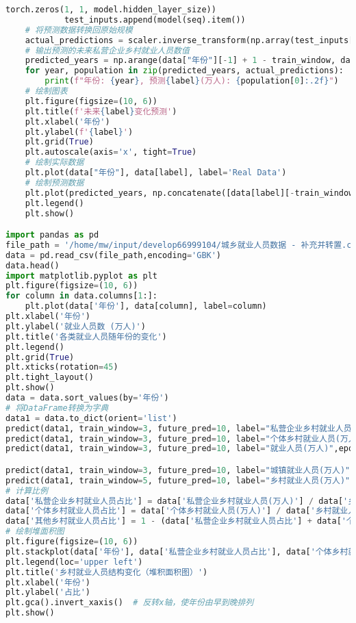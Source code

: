 \begin{lstlisting}[language=python,caption={就业前景}]
                                torch.zeros(1, 1, model.hidden_layer_size))
            test_inputs.append(model(seq).item())
    # 将预测数据转换回原始规模
    actual_predictions = scaler.inverse_transform(np.array(test_inputs[train_window:]).reshape(-1, 1))
    # 输出预测的未来私营企业乡村就业人员数值
    predicted_years = np.arange(data["年份"][-1] + 1 - train_window, data["年份"][-1] + 1 + future_pred)
    for year, population in zip(predicted_years, actual_predictions):
        print(f"年份: {year}, 预测{label}(万人): {population[0]:.2f}")
    # 绘制图表
    plt.figure(figsize=(10, 6))
    plt.title(f'未来{label}变化预测')
    plt.xlabel('年份')
    plt.ylabel(f'{label}')
    plt.grid(True)
    plt.autoscale(axis='x', tight=True)
    # 绘制实际数据
    plt.plot(data["年份"], data[label], label='Real Data')
    # 绘制预测数据
    plt.plot(predicted_years, np.concatenate([data[label][-train_window:], actual_predictions.ravel()]), label='Predictions', linestyle='--')
    plt.legend()
    plt.show()

import pandas as pd
file_path = '/home/mw/input/develop66999104/城乡就业人员数据 - 补充并转置.csv'
data = pd.read_csv(file_path,encoding='GBK')
data.head()
import matplotlib.pyplot as plt
plt.figure(figsize=(10, 6))
for column in data.columns[1:]:
    plt.plot(data['年份'], data[column], label=column)
plt.xlabel('年份')
plt.ylabel('就业人员数 (万人)')
plt.title('各类就业人员随年份的变化')
plt.legend()
plt.grid(True)
plt.xticks(rotation=45) 
plt.tight_layout()
plt.show()
data = data.sort_values(by='年份')
# 将DataFrame转换为字典
data1 = data.to_dict(orient='list')
predict(data1, train_window=3, future_pred=10, label="私营企业乡村就业人员(万人)",epochs=100,lr=0.005)
predict(data1, train_window=3, future_pred=10, label="个体乡村就业人员(万人)",epochs=50,lr=0.005)
predict(data1, train_window=3, future_pred=10, label="就业人员(万人)",epochs=100,lr=0.005)

predict(data1, train_window=3, future_pred=10, label="城镇就业人员(万人)",epochs=50,lr=0.005)
predict(data1, train_window=5, future_pred=10, label="乡村就业人员(万人)",epochs=50,lr=0.005)
# 计算比例
data['私营企业乡村就业人员占比'] = data['私营企业乡村就业人员(万人)'] / data['乡村就业人员(万人)']
data['个体乡村就业人员占比'] = data['个体乡村就业人员(万人)'] / data['乡村就业人员(万人)']
data['其他乡村就业人员占比'] = 1 - (data['私营企业乡村就业人员占比'] + data['个体乡村就业人员占比'])
# 绘制堆面积图
plt.figure(figsize=(10, 6))
plt.stackplot(data['年份'], data['私营企业乡村就业人员占比'], data['个体乡村就业人员占比'], data['其他乡村就业人员占比'], labels=['私营企业乡村就业人员', '个体乡村就业人员', '其他乡村就业人员'])
plt.legend(loc='upper left')
plt.title('乡村就业人员结构变化（堆积面积图）')
plt.xlabel('年份')
plt.ylabel('占比')
plt.gca().invert_xaxis()  # 反转x轴，使年份由早到晚排列
plt.show()
\end{lstlisting}

